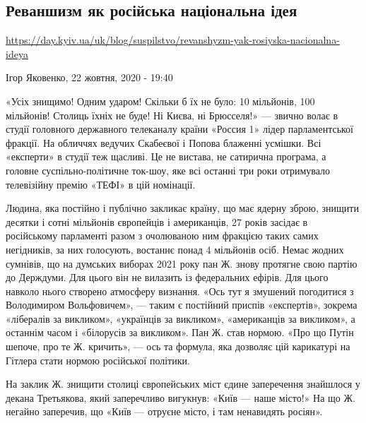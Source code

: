  
 

\subsection{Реваншизм як російська національна ідея}
\label{sec:22_10_2020.news.ua.day_kiev_ua.1.revanshizm_russia}

\url{https://day.kyiv.ua/uk/blog/suspilstvo/revanshyzm-yak-rosiyska-nacionalna-ideya}

Ігор Яковенко, 22 жовтня, 2020 - 19:40

«Усіх знищимо!  Одним ударом!  Скільки б їх не було: 10 мільйонів, 100
мільйонів! Столиць їхніх не буде! Ні Києва, ні Брюсселя!» --- звично волає в
студії головного державного телеканалу країни «Россия 1» лідер парламентської
фракції.  На обличчях ведучих Скабеєвої і Попова блаженні усмішки. Всі
«експерти» в студії теж щасливі.  Це не вистава, не сатирична програма, а
головне суспільно-політичне ток-шоу, яке всі останні три роки отримувало
телевізійну премію «ТЕФІ» в цій номінації.

Людина, яка постійно і публічно закликає країну, що має ядерну зброю, знищити
десятки і сотні мільйонів європейців і американців, 27 років засідає в
російському парламенті разом з очолюваною ним фракцією таких самих негідників,
за них голосують, востаннє понад 4 мільйонів осіб.  Немає жодних сумнівів, що
на думських виборах 2021 року пан Ж. знову протягне свою партію до Держдуми.
Для цього він не вилазить із федеральних ефірів. Для цього навколо нього
створено атмосферу визнання. «Ось тут я змушений погодитися з Володимиром
Вольфовичем», --- таким є постійний приспів «експертів», зокрема «лібералів за
викликом», «українців за викликом», «американців за викликом», а останнім часом
і «білорусів за викликом». Пан Ж. став нормою. «Про що Путін шепоче, про те Ж.
кричить», --- ось та формула, яка дозволяє цій карикатурі на Гітлера стати нормою
російської політики.

На заклик Ж. знищити столиці європейських міст єдине заперечення знайшлося у
декана Третьякова, який заперечливо вигукнув: «Київ --- наше місто!» На що Ж.
негайно заперечив, що «Київ --- отруєне місто, і там ненавидять росіян».

